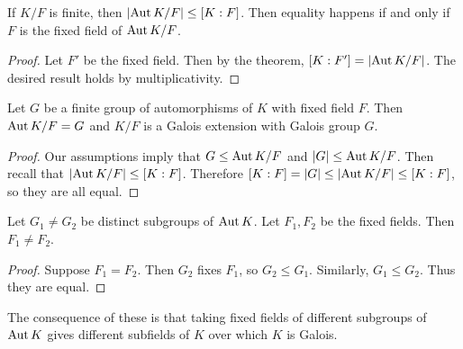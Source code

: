 \documentclass[10pt, twoside]{article}
\begin{document}
    \begin{cor}
        If $K/F$ is finite, then $\lvert\operatorname{Aut}{K/F}\rvert \leq [K:F]$. Then equality happens if and only if $F$ is the fixed field of $\operatorname{Aut}{K/F}$.
        \begin{proof}
            Let $F'$ be the fixed field. Then by the theorem, $[K:F'] = \lvert\operatorname{Aut}{K/F}\rvert$. The desired result holds by multiplicativity.
        \end{proof}
    \end{cor}
    
    \begin{cor}
        Let $G$ be a finite group of automorphisms of $K$ with fixed field $F$. Then $\operatorname{Aut}{K/F} = G$ and $K/F$ is a Galois extension with Galois group $G$.
        \begin{proof}
            Our assumptions imply that $G \leq \operatorname{Aut}{K/F}$ and $\lvert G\rvert \leq \operatorname{Aut}{K/F}$. Then recall that $\lvert\operatorname{Aut}{K/F}\rvert \leq [K:F]$. Therefore $[K:F] = \lvert G\rvert \leq \lvert\operatorname{Aut}{K/F}\rvert \leq [K:F]$, so they are all equal.
        \end{proof}
    \end{cor}

    \begin{cor}
        Let $G_1 \neq G_2$ be distinct subgroups of $\operatorname{Aut}{K}$. Let $F_1,F_2$ be the fixed fields. Then $F_1 \neq F_2$.
        \begin{proof}
            Suppose $F_1 = F_2$. Then $G_2$ fixes $F_1$, so $G_2 \leq G_1$. Similarly, $G_1 \leq G_2$. Thus they are equal.
        \end{proof}
    \end{cor}

    The consequence of these is that taking fixed fields of different subgroups of $\operatorname{Aut}{K}$ gives different subfields of $K$ over which $K$ is Galois.
\end{document}
